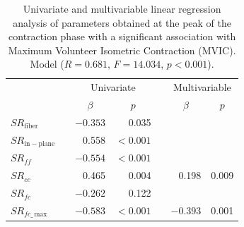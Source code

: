 \begin{table}[!htb]
\vspace{+0.2cm}
\caption[Univariate and multivariable linear regression analysis of parameters obtained at force peak with maximum volunteer isometric contraction]{Univariate and multivariable linear regression analysis of parameters obtained at the peak of the contraction phase with a significant association with Maximum Volunteer Isometric Contraction (MVIC). Model ($R=0.681$, $F=14.034$, $p<0.001$).}
\label{tab: SR2_3}
\begin{center}
\begin{tabular}{@{}llrrrrr@{}}
\toprule[1pt]\midrule[0.3pt]
               && \multicolumn{2}{c}{Univariate} &  & \multicolumn{2}{c}{Multivariable} \\ \cmidrule(lr){3-4} \cmidrule(lr){6-7}
               && \multicolumn{1}{c}{$\beta$}     & \multicolumn{1}{c}{$p$}            &  & \multicolumn{1}{c}{$\beta$}       & \multicolumn{1}{c}{$p$}              \\ \midrule
$SR_{\mathrm{fiber}}$       & & $-0.353$   & 0.035              &  &            &                     \\ [2pt]
$SR_{\mathrm{in-plane}}$    & & 0.558    & $<0.001$   &  &            & 		                \\ [2pt]
$SR_{ff}$   				& & $-0.554$   & $<0.001$   &  &            &                     \\ [2pt]
$SR_{cc}$ 			   		& & 0.465    & 0.004			  	  &  & 	0.198	  &   0.009             \\ [2pt]
$SR_{fc}$  					& & $-0.262$   & 0.122              &  &            &                     \\ [2pt]
$SR_{fc\_\,\mathrm{max}}$   & & $-0.583$   & $<0.001$   &  &  $-0.393$    &   0.001  			\\ \midrule[0.3pt]\bottomrule[1pt]
\end{tabular}
\end{center}
\vspace{-0.2cm}
\end{table}
%
%
%
